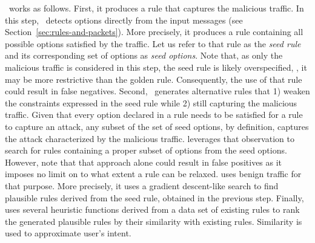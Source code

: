 \documentclass[sigconf,review, anonymous]{acmart}
\begin{document}
\tname\ works as follows. First, it produces a rule that captures the
malicious traffic. In this step, \tname\ detects options directly from
the input messages (see Section~\ref{sec:rules-and-packets}). More
precisely, it produces a rule containing all possible options
satisfied by the traffic. Let us refer to that rule as the \emph{seed
  rule} and its corresponding set of options as \emph{seed
  options}. Note that, as only the malicious traffic is considered in
this step, the seed rule is likely overspecified, \ie{}, it may be
more restrictive than the golden rule. Consequently, the use of that
rule could result in false negatives. Second, \tname\ generates
alternative rules that 1) weaken the constraints expressed in the seed
rule while 2) still capturing the malicious traffic. Given that every
option declared in a rule needs to be satisfied for a rule to capture
an attack, any subset of the set of seed options, by definition,
captures the attack characterized by the malicious traffic. \tname{}
leverages that observation to search for rules containing a proper
subset of options from the seed options. However, note that that
approach alone could result in false positives as it imposes no limit
on to what extent a rule can be relaxed. \tname{} uses benign traffic
for that purpose. More precisely, it uses a gradient descent-like
search to find plausible rules derived from the seed rule, obtained in
the previous step. Finally, \tname{} uses several heuristic functions
derived from a data set of existing rules to rank the generated
plausible rules by their similarity with existing rules. Similarity is
used to approximate user's intent.




\end{document}
